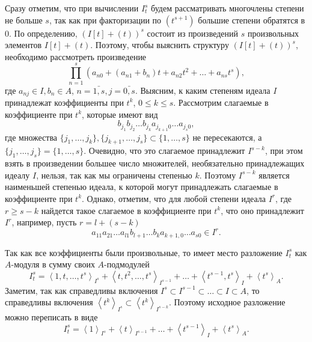     \begin{Proof}
        Сразу отметим, что при вычислении $I^s_t$ будем рассматривать многочлены степени не больше $s$,
        так как при факторизации по $(t^{s + 1})$ большие степени обратятся в 0. 
        По определению, $(I[t] + (t))^s$ состоит из произведений $s$ произвольных
        элементов $I[t] + (t)$. Поэтому, чтобы выяснить структуру $(I[t] + (t))^s$, необходимо рассмотреть
        произведение
        \begin{equation*}
            \prod_{n = 1}^s \left( a_{n0} + (a_{n1} + b_n)t + a_{n2}t^2 + \dots + a_{ns}t^s \right),
        \end{equation*}
        где $a_{nj} \in I, b_n \in A$, $n = \bar{1, s}, j = \bar{0, s}$.
        Выясним, к каким степеням идеала $I$ принадлежат коэффициенты при $t^k$, $0 \leq k \leq s$.
        Рассмотрим слагаемые в коэффициенте при $t^k$, которые имеют вид
        \begin{equation*}
            b_{j_1}b_{j_2}\dots  b_{j_k}a_{j_{k+1}0}\dots a_{j_s0},
        \end{equation*}
        где множества $\{j_1, \dots, j_k\}, \{j_{k+1}, \dots, j_s\} \subset \{1, \dots, s\}$ не пересекаются, а
        $\{j_1, \dots, j_s\} = \{1, \dots, s\}$. Очевидно, что это слагаемое принадлежит $I^{s - k}$,
        при этом взять в произведении большее число множителей, необязательно принадлежащих идеалу $I$, 
        нельзя, так как мы ограничены степенью $k$. Поэтому
        $I^{s - k}$ является наименьшей степенью идеала, к которой могут принадлежать слагаемые в коэффициенте при $t^k$.
        Однако, отметим, что для любой степени идеала $I^r$, где $r \geq s - k$ найдется такое слагаемое 
        в коэффициенте при $t^k$, что оно принадлежит $I^r$, например, пусть $r = l + (s - k)$
        \begin{equation*}
            a_{11}a_{21}\dots a_{l1}b_{l + 1}\dots b_k a_{k + 1, 0}\dots a_{s0} \in I^r.
        \end{equation*}

        Так как все коэффициенты были произвольные, то имеет место разложение $I^s_t$ как $A$-модуля 
        в сумму своих $A$-подмодулей
        \begin{equation*}
            I^s_t = \left< 1, t, \dots, t^s \right>_{I^s} + 
            \left< t, t^2, \dots, t^s \right>_{I^{s-1}} + 
            \dots +
            \left< t^{s-1}, t^s \right>_{I} + 
            \left< t^s \right>_A.
        \end{equation*}
        Заметим, так как справедливы включения $I^s \subset I^{s - 1} \subset \dots \subset I \subset A$,
        то справедливы включения $\left< t^k \right>_{I^s} \subset \left< t^k \right>_{I^{s - k}}$. 
        Поэтому исходное разложение можно переписать в виде
        \begin{equation*}
            I^s_t = \left< 1  \right>_{I^s} + 
                    \left< t \right>_{I^{s-1}} + 
                    \dots +
                    \left< t^{s-1} \right>_{I} + 
                    \left< t^s \right>_A.
        \end{equation*}
    \end{Proof}
